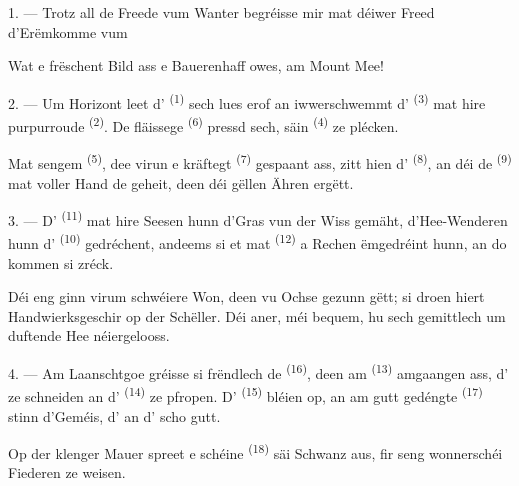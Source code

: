 \VUsaut{3.0mm}
\VUsaut{3.0mm}

\VUsaut{4.0mm}

1. --- Trotz all de Freede vum Wanter begréisse mir mat déiwer Freed d'Erëmkomme vum

Wat e frëschent Bild ass e Bauerenhaff owes, am Mount Mee!

2. --- Um Horizont leet d' \textsuperscript{(1)} sech lues erof an
iwwerschwemmt d' \textsuperscript{(3)} mat hire purpurroude
 \textsuperscript{(2)}. De fläissege 
\textsuperscript{(6)} pressd sech, säin  \textsuperscript{(4)} ze
plécken.

Mat sengem  \textsuperscript{(5)}, dee virun e kräftegt 
\textsuperscript{(7)} gespaant ass, zitt hien d'
\textsuperscript{(8)}, an déi de  \textsuperscript{(9)} mat voller Hand
de  geheit, deen déi gëllen Ähren ergëtt.

3. --- D' \textsuperscript{(11)} mat hire Seesen hunn d'Gras vun der
Wiss gemäht, d'Hee-Wenderen hunn d' \textsuperscript{(10)} gedréchent,
andeems si et mat  \textsuperscript{(12)} a Rechen ëmgedréint hunn, an
do kommen si zréck.

Déi eng ginn virum schwéiere Won, deen vu Ochse gezunn gëtt; si droen hiert
Handwierksgeschir op der Schëller. Déi aner, méi bequem, hu sech gemittlech um
duftende Hee néiergelooss.

4. --- Am Laanschtgoe gréisse si frëndlech de 
\textsuperscript{(16)}, deen am  \textsuperscript{(13)} amgaangen
ass, d' ze schneiden an d'
\textsuperscript{(14)} ze pfropen. D' \textsuperscript{(15)} bléien
op, an am gutt gedéngte  \textsuperscript{(17)} stinn d'Geméis,
d' an d' scho gutt.

Op der klenger Mauer spreet e schéine  \textsuperscript{(18)} säi
Schwanz aus, fir seng wonnerschéi Fiederen ze weisen.

\VUsaut{3.0mm}

